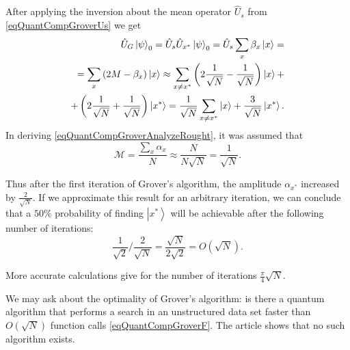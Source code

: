 After applying the inversion about the mean operator $\hat{U}_s$ 
from \eqref{eqQuantCompGroverUs} we get
\begin{eqnarray}
\hat{U}_G \left|\psi\right>_0 = 
\hat{U}_s \hat{U}_{x^{\ast}} \left|\psi\right>_0 = 
\hat{U}_s \sum_x \beta_x \ket{x} = 
\nonumber \\
= \sum_x \left(2 M - \beta_x\right) \ket{x} \approx 
\sum_{x\ne x^{\ast}} \left( 2 \frac{1}{\sqrt{N}} - \frac{1}{\sqrt{N}}
\right) \ket{x} + 
\nonumber \\
+ \left( 2 \frac{1}{\sqrt{N}} +
\frac{1}{\sqrt{N}} \right) \left|x^{\ast}\right> = 
\frac{1}{\sqrt{N}}\sum_{x\ne x^{\ast}} \ket{x} + 
\frac{3}{\sqrt{N}} \left|x^{\ast}\right>.
\label{eqQuantCompGroverAnalyzeRought}
\end{eqnarray}
In deriving \eqref{eqQuantCompGroverAnalyzeRought}, it was assumed that
\[
\mathcal{M} = \frac{\sum_x \alpha_x}{N} \approx
\frac{N}{N \sqrt{N}} = \frac{1}{\sqrt{N}}.
\]

Thus after the first iteration of Grover's algorithm, the amplitude
$\alpha_{x^{\ast}}$ increased by $\frac{2}{\sqrt{N}}$. If
we approximate this result for an arbitrary iteration, we can
conclude that a $50\%$ probability of finding $\left|x^{\ast}\right>$
will be achievable after the following number of iterations:
\[
\frac{1}{\sqrt{2}}/\frac{2}{\sqrt{N}} =
\frac{\sqrt{N}}{2 \sqrt{2}} = O\left(\sqrt{N}\right).
\]

More accurate calculations \cite{nielsen2000quantum} give for the number of iterations
$\frac{\pi}{4}\sqrt{N}$. 

We may ask about the optimality of Grover's algorithm: is there
a quantum algorithm that performs a search in an unstructured
data set faster than $O\left(\sqrt{N}\right)$ function calls
\eqref{eqQuantCompGroverF}. The article
\cite{bBennettGroverOptimal} shows that no such algorithm
exists.